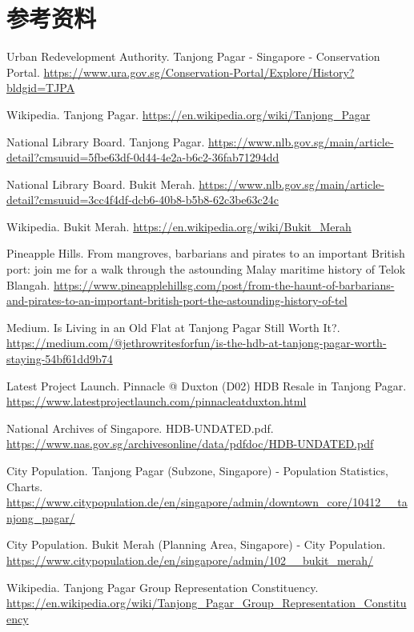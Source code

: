 \documentclass[11pt,a4paper,twoside,openany]{book}
\begin{document}
\section*{参考资料}
\begin{enumerate}[label={[\arabic*]},leftmargin=*,topsep=2pt,itemsep=1pt,parsep=0pt]
  \item Urban Redevelopment Authority. Tanjong Pagar - Singapore - Conservation Portal. \url{https://www.ura.gov.sg/Conservation-Portal/Explore/History?bldgid=TJPA}
  \item Wikipedia. Tanjong Pagar. \url{https://en.wikipedia.org/wiki/Tanjong_Pagar}
  \item National Library Board. Tanjong Pagar. \url{https://www.nlb.gov.sg/main/article-detail?cmsuuid=5fbe63df-0d44-4e2a-b6c2-36fab71294dd}
  \item National Library Board. Bukit Merah. \url{https://www.nlb.gov.sg/main/article-detail?cmsuuid=3cc4f4df-dcb6-40b8-b5b8-62c3be63c24c}
  \item Wikipedia. Bukit Merah. \url{https://en.wikipedia.org/wiki/Bukit_Merah}
  \item Pineapple Hills. From mangroves, barbarians and pirates to an important British port: join me for a walk through the astounding Malay maritime history of Telok Blangah. \url{https://www.pineapplehillsg.com/post/from-the-haunt-of-barbarians-and-pirates-to-an-important-british-port-the-astounding-history-of-tel}
  \item Medium. Is Living in an Old Flat at Tanjong Pagar Still Worth It?. \url{https://medium.com/@jethrowritesforfun/is-the-hdb-at-tanjong-pagar-worth-staying-54bf61dd9b74}
  \item Latest Project Launch. Pinnacle @ Duxton (D02) HDB Resale in Tanjong Pagar. \url{https://www.latestprojectlaunch.com/pinnacleatduxton.html}
  \item National Archives of Singapore. HDB-UNDATED.pdf. \url{https://www.nas.gov.sg/archivesonline/data/pdfdoc/HDB-UNDATED.pdf}
  \item City Population. Tanjong Pagar (Subzone, Singapore) - Population Statistics, Charts. \url{https://www.citypopulation.de/en/singapore/admin/downtown_core/10412__tanjong_pagar/}
  \item City Population. Bukit Merah (Planning Area, Singapore) - City Population. \url{https://www.citypopulation.de/en/singapore/admin/102__bukit_merah/}
  \item Wikipedia. Tanjong Pagar Group Representation Constituency. \url{https://en.wikipedia.org/wiki/Tanjong_Pagar_Group_Representation_Constituency}

\end{enumerate}
\end{document}
